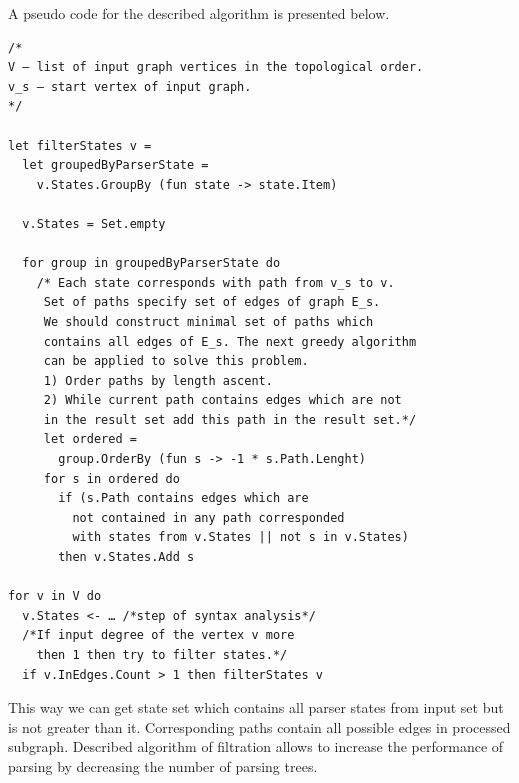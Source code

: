 A pseudo code for the described algorithm is presented below.
\scriptsize
\begin{verbatim}
/*
V – list of input graph vertices in the topological order.
v_s – start vertex of input graph.
*/

let filterStates v =
  let groupedByParserState =
    v.States.GroupBy (fun state -> state.Item)

  v.States = Set.empty

  for group in groupedByParserState do
    /* Each state corresponds with path from v_s to v.
     Set of paths specify set of edges of graph E_s.
     We should construct minimal set of paths which
     contains all edges of E_s. The next greedy algorithm
     can be applied to solve this problem.
     1) Order paths by length ascent.
     2) While current path contains edges which are not
     in the result set add this path in the result set.*/
     let ordered = 
       group.OrderBy (fun s -> -1 * s.Path.Lenght)
     for s in ordered do
       if (s.Path contains edges which are 
         not contained in any path corresponded
         with states from v.States || not s in v.States) 
       then v.States.Add s

for v in V do
  v.States <- … /*step of syntax analysis*/
  /*If input degree of the vertex v more 
    then 1 then try to filter states.*/
  if v.InEdges.Count > 1 then filterStates v

\end{verbatim}
\normalsize

This way we can get state set which contains all parser states from input set but is not greater 
than it. Corresponding paths contain all possible edges in processed subgraph. Described algorithm
of filtration allows to increase the performance of parsing by decreasing the number of parsing trees.
